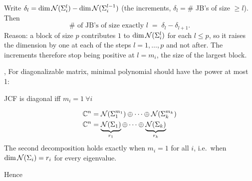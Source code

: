 \begin{insight}
Write $\delta_l=\dim\mathcal{N}(\Sigma_i^l)-\dim\mathcal{N}(\Sigma_i^{l-1})$ (the increments, $\delta_l=\#$ JB's of size $\ge l$). Then
\[
\#\text{ of JB's of size exactly } l \;=\; \delta_l-\delta_{l+1}.
\]
Reason: a block of size $p$ contributes $1$ to $\dim\mathcal{N}(\Sigma_i^l)$ for each $l\le p$, so it raises the dimension by one at each of the steps $l=1,\dots,p$ and not after. The increments therefore stop being positive at $l=m_i$, the size of the largest block.
\end{insight}

\sep
{}
\point For diagonalizable matrix, minimal polynomial should have the power at most 1:
\begin{keybox}
\centering JCF is diagonal iff $m_i=1\ \forall i$
\end{keybox}
\begin{align*}
\mathbb{C}^n&=\mathcal{N}(\Sigma_1^{m_1})\oplus\cdots\oplus\mathcal{N}(\Sigma_k^{m_k})\\
\mathbb{C}^n&=\underbrace{\mathcal{N}(\Sigma_1)}_{r_1}\oplus\cdots\oplus\underbrace{\mathcal{N}(\Sigma_k)}_{r_k}
\end{align*}
The second decomposition holds exactly when $m_i=1$ for all $i$, i.e.\ when $\dim\mathcal{N}(\Sigma_i)=r_i$ for every eigenvalue.

Hence 

